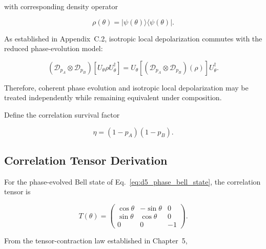 with corresponding density operator

\begin{equation}
\rho(\theta)
=
|\psi(\theta)\rangle
\langle
\psi(\theta)
|.
\end{equation}

\medskip

As established in Appendix~C.2, isotropic local depolarization commutes with the reduced phase-evolution model:

\begin{equation}
\left(
\mathcal{D}_{p_A}
\otimes
\mathcal{D}_{p_B}
\right)
\left[
U_{\theta}
\rho
U_{\theta}^{\dagger}
\right]
=
U_{\theta}
\left[
\left(
\mathcal{D}_{p_A}
\otimes
\mathcal{D}_{p_B}
\right)
(\rho)
\right]
U_{\theta}^{\dagger}.
\label{eq:d5_channel_commutation}
\end{equation}

Therefore, coherent phase evolution and isotropic local depolarization may be treated independently while remaining equivalent under composition.

\medskip

Define the correlation survival factor

\begin{equation}
\eta
=
(1-p_A)(1-p_B).
\label{eq:d5_eta_definition}
\end{equation}

\medskip


\subsection{Correlation Tensor Derivation}

For the phase-evolved Bell state of Eq.~\eqref{eq:d5_phase_bell_state}, the correlation tensor is

\begin{equation}
T(\theta)
=
\begin{pmatrix}
\cos\theta & -\sin\theta & 0 \\
\sin\theta & \cos\theta & 0 \\
0 & 0 & -1
\end{pmatrix}.
\label{eq:d5_phase_tensor}
\end{equation}

\medskip

From the tensor-contraction law established in Chapter~5,

